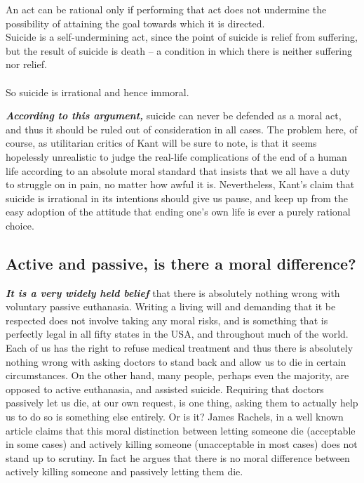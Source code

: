 \documentclass[12pt, openany]{book}
\begin{document}
\begin{center}

\begin{argument}

An act can be rational only if performing that act does not undermine the possibility of attaining the goal towards which it is directed.\\
Suicide is a self-undermining act, since the point of suicide is relief from suffering, but the result of suicide is death -- a condition in which there is neither suffering nor relief.\\
~\\
So suicide is irrational and hence immoral.

\end{argument}

\end{center}

\textbf{\emph{According to this argument,}} suicide can never be defended as a moral act, and thus it should be ruled out of consideration in all cases. The problem here, of course, as utilitarian critics of Kant will be sure to note, is that it seems hopelessly unrealistic to judge the real-life complications of the end of a human life according to an absolute moral standard that insists that we all have a duty to struggle on in pain, no matter how awful it is. Nevertheless, Kant's claim that suicide is irrational in its intentions should give us pause, and keep up from the easy adoption of the attitude that ending one's own life is ever a purely rational choice.

\hypertarget{active-and-passive-is-there-a-moral-difference}{%
\subsection*{Active and passive, is there a moral difference?}\label{active-and-passive-is-there-a-moral-difference}}


\textbf{\emph{It is a very widely held belief}} that there is absolutely nothing wrong with voluntary passive euthanasia. Writing a living will and demanding that it be respected does not involve taking any moral risks, and is something that is perfectly legal in all fifty states in the USA, and throughout much of the world. Each of us has the right to refuse medical treatment and thus there is absolutely nothing wrong with asking doctors to stand back and allow us to die in certain circumstances. On the other hand, many people, perhaps even the majority, are opposed to active euthanasia, and assisted suicide. Requiring that doctors passively let us die, at our own request, is one thing, asking them to actually help us to do so is something else entirely. Or is it? James Rachels, in a well known article claims that this moral distinction between letting someone die (acceptable in some cases) and actively killing someone (unacceptable in most cases) does not stand up to scrutiny. In fact he argues that there is no moral difference between actively killing someone and passively letting them die.
\end{document}
